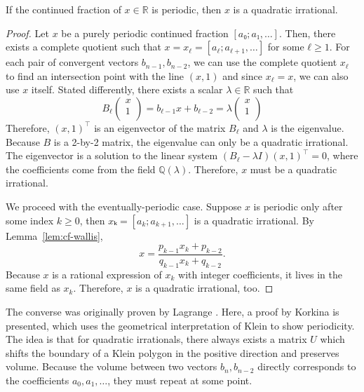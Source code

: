 \begin{theorem}
  If the continued fraction of $x ∈ ℝ$ is periodic, then $x$ is a quadratic irrational.
\end{theorem}

\begin{proof}
  Let $x$ be a purely periodic continued fraction $[a₀; a₁, …]$.
  Then, there exists a complete quotient such that $x = x_ℓ = [a_ℓ; a_{ℓ+1}, …]$ for some $ℓ ≥ 1$.
  For each pair of convergent vectors $b_{n-1}, b_{n-2}$, we can use the
  complete quotient $x_ℓ$ to find an intersection point with the line $(x, 1)$
  and since $x_ℓ = x$, we can also use $x$ itself.
  Stated differently, there exists a scalar $λ ∈ ℝ$ such that
  \[
    B_ℓ
    \begin{pmatrix}
      x \\
      1 \\
    \end{pmatrix}
    =
    b_{ℓ-1} x + b_{ℓ-2}
    = λ
    \begin{pmatrix}
      x \\
      1 \\
    \end{pmatrix}
  \]
  Therefore, $(x, 1)^⊤$ is an eigenvector of the matrix $B_ℓ$
  and $λ$ is the eigenvalue.
  Because $B$ is a 2-by-2 matrix,
  the eigenvalue can only be a quadratic irrational.
  The eigenvector is a solution to the linear system $(B_ℓ - λ I) (x, 1)^⊤ = 0$,
  where the coefficients come from the field $ℚ(λ)$.
  Therefore, $x$ must be a quadratic irrational.

  We proceed with the eventually-periodic case.
  Suppose $x$ is periodic only after some index $k ≥ 0$,
  then $xₖ = [a_k; a_{k+1}, …]$ is a quadratic irrational.
  By Lemma~\ref{lem:cf-wallis},
  \[
    x = \frac{p_{k-1} x_k + p_{k-2}}{q_{k-1} x_k + q_{k-2}}.
  \]
  Because $x$ is a rational expression of $x_k$ with integer coefficients,
  it lives in the same field as $x_k$.
  Therefore, $x$ is a quadratic irrational, too.
\end{proof}

The converse was originally proven by Lagrange \cite{Lagrange70}.
Here, a proof by Korkina \cite{Korkina96} is presented,
which uses the geometrical interpretation of Klein to show periodicity.
The idea is that for quadratic irrationals,
there always exists a matrix $U$ which shifts the boundary of a Klein polygon
in the positive direction and preserves volume.
Because the volume between two vectors $b_n, b_{n-2}$ directly corresponds to
the coefficients $a_0, a_1, …$, they must repeat at some point.

